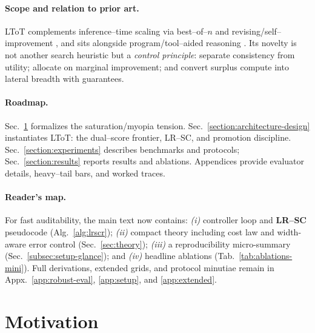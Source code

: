 \documentclass{article}
\begin{document}
\paragraph{Scope and relation to prior art.}
LToT complements inference--time scaling via best--of--$n$ \citep{chen2024bot,yang2024bot} and revising/self--improvement \citep{madaan2023selfrefine}, and sits alongside program/tool--aided reasoning \citep{gao2022pal,chen2022pot}.
Its novelty is not another search heuristic but a \emph{control principle}: separate consistency from utility; allocate on marginal improvement; and convert surplus compute into lateral breadth with guarantees.

\paragraph{Roadmap.}
Sec.~\ref{section:motivation} formalizes the saturation/myopia tension.
Sec.~\ref{section:architecture-design} instantiates LToT: the dual--score frontier, LR--SC, and promotion discipline.
Sec.~\ref{section:experiments} describes benchmarks and protocols; Sec.~\ref{section:results} reports results and ablations.
Appendices provide evaluator details, heavy--tail bars, and worked traces.

\paragraph{Reader's map.} For fast auditability, the main text now contains:
\emph{(i)} controller loop and \textbf{LR--SC} pseudocode (Alg.~\ref{alg:lrscr});
\emph{(ii)} compact theory including cost law and width-aware error control (Sec.~\ref{sec:theory});
\emph{(iii)} a reproducibility micro-summary (Sec.~\ref{subsec:setup-glance}); and
\emph{(iv)} headline ablations (Tab.~\ref{tab:ablations-mini}).
Full derivations, extended grids, and protocol minutiae remain in Appx.~\ref{app:robust-eval}, \ref{app:setup}, and \ref{app:extended}.

\section{Motivation}
\label{section:motivation}
\end{document}

